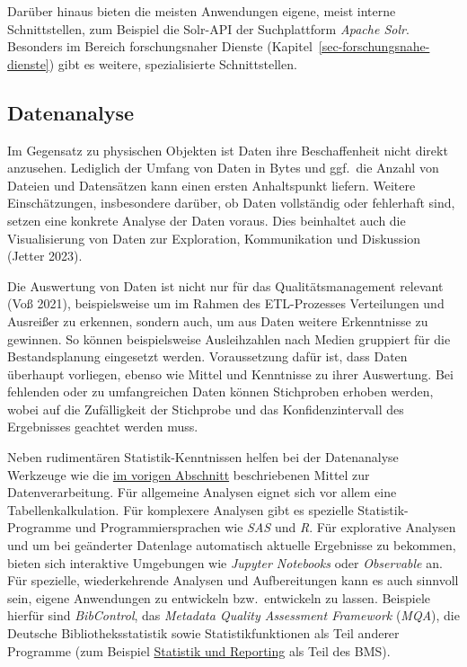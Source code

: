 \documentclass[
  11pt,
  letterpaper,
  DIV=11,
  twoside]{scrreprt}
\begin{document}
Darüber hinaus bieten die meisten Anwendungen eigene, meist interne
Schnittstellen, zum Beispiel die Solr-API der Suchplattform \emph{Apache
Solr}. Besonders im Bereich forschungsnaher Dienste
(Kapitel~\ref{sec-forschungsnahe-dienste}) gibt es weitere,
spezialisierte Schnittstellen.

\subsection{Datenanalyse}\label{datenanalyse}

Im Gegensatz zu physischen Objekten ist Daten ihre Beschaffenheit nicht
direkt anzusehen. Lediglich der Umfang von Daten in Bytes und ggf.~die
Anzahl von Dateien und Datensätzen kann einen ersten Anhaltspunkt
liefern. Weitere Einschätzungen, insbesondere darüber, ob Daten
vollständig oder fehlerhaft sind, setzen eine konkrete Analyse der Daten
voraus. Dies beinhaltet auch die Visualisierung von Daten zur
Exploration, Kommunikation und Diskussion (Jetter 2023).

Die Auswertung von Daten ist nicht nur für das Qualitätsmanagement
relevant (Voß 2021), beispielsweise um im Rahmen des ETL-Prozesses
Verteilungen und Ausreißer zu erkennen, sondern auch, um aus Daten
weitere Erkenntnisse zu gewinnen. So können beispielsweise Ausleihzahlen
nach Medien gruppiert für die Bestandsplanung eingesetzt werden.
Voraussetzung dafür ist, dass Daten überhaupt vorliegen, ebenso wie
Mittel und Kenntnisse zu ihrer Auswertung. Bei fehlenden oder zu
umfangreichen Daten können Stichproben erhoben werden, wobei auf die
Zufälligkeit der Stichprobe und das Konfidenzintervall des Ergebnisses
geachtet werden muss.

Neben rudimentären Statistik-Kenntnissen helfen bei der Datenanalyse
Werkzeuge wie die \hyperref[werkzeuge]{im vorigen Abschnitt}
beschriebenen Mittel zur Datenverarbeitung. Für allgemeine Analysen
eignet sich vor allem eine Tabellenkalkulation. Für komplexere Analysen
gibt es spezielle Statistik-Programme und Programmiersprachen wie
\emph{SAS} und \emph{R}. Für explorative Analysen und um bei geänderter
Datenlage automatisch aktuelle Ergebnisse zu bekommen, bieten sich
interaktive Umgebungen wie \emph{Jupyter Notebooks} oder
\emph{Observable} an. Für spezielle, wiederkehrende Analysen und
Aufbereitungen kann es auch sinnvoll sein, eigene Anwendungen zu
entwickeln bzw.~entwickeln zu lassen. Beispiele hierfür sind
\emph{BibControl}, das \emph{Metadata Quality Assessment Framework}
(\emph{MQA}), die Deutsche Bibliotheksstatistik sowie
Statistikfunktionen als Teil anderer Programme (zum Beispiel
\hyperref[statistik-und-reporting]{Statistik und Reporting} als Teil des
BMS).
\end{document}
